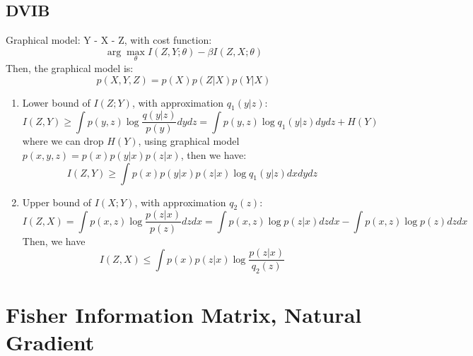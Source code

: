 \documentclass{article}
\begin{document}
\subsection{DVIB}
Graphical model: Y - X - Z, with cost function:
\begin{equation}
\arg\max_{\theta}I(Z,Y;\theta)-\beta I(Z,X;\theta)
\end{equation}
Then, the graphical model is:
\begin{equation*}
p(X,Y,Z)=p(X)p(Z|X)p(Y|X)
\end{equation*}
\begin{enumerate}
\item Lower bound of $I(Z;Y)$, with approximation $q_1(y|z)$:
\begin{equation*}
I(Z,Y)\ge\int p(y,z)\log\frac{q(y|z)}{p(y)} dy dz=\int p(y,z)\log q_1(y|z)  dy dz+ H(Y)
\end{equation*}
where we can drop $H(Y)$, using graphical model $p(x,y,z)=p(x)p(y|x)p(z|x)$, then we have:
\begin{equation*}
I(Z,Y)\ge\int p(x)p(y|x)p(z|x)\log q_1(y|z) dx dy dz
\end{equation*}
\item Upper bound of $I(X;Y)$, with approximation $q_2(z)$:
\begin{equation*}
I(Z,X)=\int p(x,z)\log\frac{p(z|x)}{p(z)}dz dx = \int p(x,z)\log p(z|x)dz dx - \int p(x,z)\log p(z)dz dx
\end{equation*}
Then, we have
\begin{equation*}
I(Z,X)\le \int p(x)p(z|x)\log\frac{p(z|x)}{q_2(z)}
\end{equation*}

\end{enumerate}

\section{Fisher Information Matrix, Natural Gradient}
\end{document}
